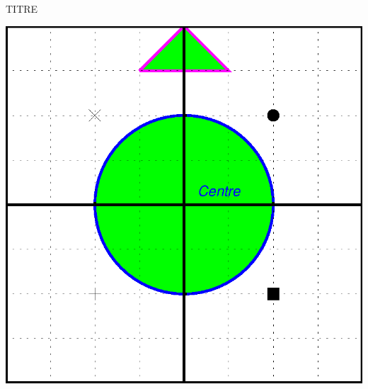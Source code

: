 \documentclass[12pt,fullpage]{article}
\begin{document}
\begin{center}
\LARGE  TITRE
\end{center}

\vspace{2cm}

\includegraphics{toto.ps}

\end{document}
